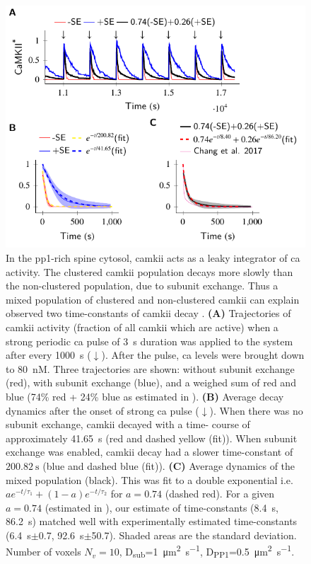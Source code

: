 \documentclass[9pt,lineno,doublespacing]{elife}
\newcommand\SUB[2]{#1\textsubscript{#2}}
\begin{document}
\begin{figure}%
    \includegraphics[width=11.4cm]{PaperFigures/elifeFigure6/figure_two_timecourses_114mm.pdf}
    \caption{ In the \gls{pp1}-rich spine cytosol, \gls{camkii} acts as a leaky integrator of \gls{ca} 
        activity. The clustered \gls{camkii} population decays more
	slowly than the non-clustered population, due to subunit exchange. 
	Thus a mixed population of clustered and non-clustered \gls{camkii}
        can explain observed two time-constants of \gls{camkii} decay \citep{chang_camkii_2017}.
        \textbf{(A)} Trajectories of \gls{camkii} activity (fraction of all
        \gls{camkii} which are active) when a strong periodic \gls{ca} pulse of \SI{3}{\second}
        duration was applied to the system after every \SI{1000}{\second} ($\downarrow$).
        After the pulse, \gls{ca} levels were brought down to \SI{80}{\nano M}. 
        Three trajectories are shown: without subunit exchange (red), with
        subunit exchange (blue), and a weighed sum of red and blue (74\%
        red + 24\% blue as estimated in \citep{chang_camkii_2017}). 
        \textbf{(B)} Average decay dynamics after the onset of strong \gls{ca} pulse ($\downarrow$). 
        When there was no subunit exchange, \gls{camkii} decayed with a time-
	course of approximately \SI{41.65}{\second} (red and dashed yellow (fit)). 
	When subunit exchange was enabled, \gls{camkii} decay had a slower time-constant 
        of $\SI{200.82}{\second}$ (blue and dashed blue (fit)). 
        \textbf{(C)} Average dynamics of the 
	mixed population (black). This was fit to a double
        exponential i.e. $ae^{-t/\tau_{1}}+(1-a)e^{-t/\tau_{2}}$ for
        $a=0.74$ (dashed red). 
        For a given $a=0.74$ (estimated in \citep{chang_camkii_2017}), our
        estimate of time-constants (\SI{8.4}{\second}, \SI{86.2}{\second}) 
	matched well with experimentally
        estimated time-constants (\SI{6.4}{\second}$\pm$0.7, \SI{92.6}{\second}$\pm$50.7). 
        Shaded areas are the standard deviation. Number of voxels $N_{v}=10$,
        \SUB{D}{sub}=\SI{1}{\micro\meter\squared\per\second},
        \SUB{D}{PP1}=\SI{0.5}{\micro\meter\squared\per\second}.
    }\label{fig:cytosol_integrator}
\end{figure}
\end{document}
